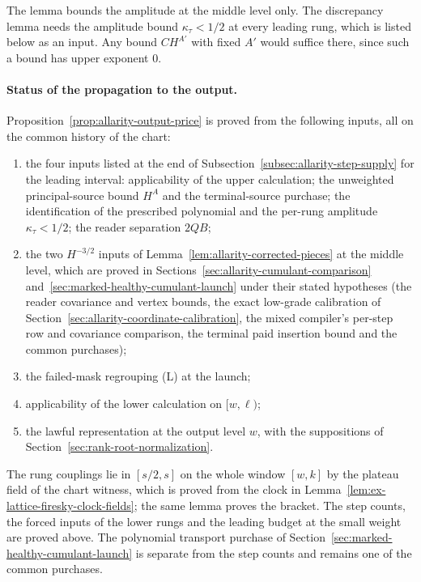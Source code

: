 The lemma bounds the amplitude at the middle level only. The discrepancy
lemma needs the amplitude bound $\kappa_\tau<1/2$ at every leading rung,
which is listed below as an input. Any bound $CH^{A'}$ with fixed $A'$
would suffice there, since such a bound has upper exponent $0$.

\paragraph{Status of the propagation to the output.}
Proposition~\ref{prop:allarity-output-price} is proved from the
following inputs, all on the common history of the chart:
\begin{enumerate}
\item the four inputs listed at the end of
 Subsection~\ref{subsec:allarity-step-supply} for the leading interval:
 applicability of the upper calculation; the unweighted principal-source
 bound $H^A$ and the terminal-source purchase; the identification of the
 prescribed polynomial and the per-rung amplitude $\kappa_\tau<1/2$; the
 reader separation $2QB$;
\item the two $H^{-3/2}$ inputs of Lemma~\ref{lem:allarity-corrected-pieces}
 at the middle level, which are proved in
 Sections~\ref{sec:allarity-cumulant-comparison}
 and~\ref{sec:marked-healthy-cumulant-launch} under their stated
 hypotheses (the reader covariance and vertex bounds, the exact low-grade
 calibration of Section~\ref{sec:allarity-coordinate-calibration}, the
 mixed compiler's per-step row and covariance comparison, the terminal
 paid insertion bound and the common purchases);
\item the failed-mask regrouping (L) at the launch;
\item applicability of the lower calculation on $[w,\ell)$;
\item the lawful representation at the output level $w$, with the
 suppositions of Section~\ref{sec:rank-root-normalization}.
\end{enumerate}
The rung couplings lie in $[s/2,s]$ on the whole window $[w,k]$ by the
plateau field of the chart witness, which is proved from the clock in
Lemma~\ref{lem:ex-lattice-firesky-clock-fields}; the same lemma proves the
bracket. The step counts, the forced inputs of the lower rungs and the
leading budget at the small weight are proved above. The polynomial
transport purchase of Section~\ref{sec:marked-healthy-cumulant-launch} is
separate from the step counts and remains one of the common purchases.
